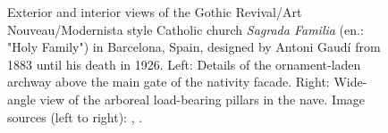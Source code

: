 \documentclass{article}
\begin{document}
\begin{figure}
    \centering
    \caption{Exterior and interior views of the Gothic Revival/Art Nouveau/Modernista style Catholic church \textit{Sagrada Familia} (en.: "Holy Family") in Barcelona, Spain, designed by Antoni Gaudí from 1883 until his death in 1926. Left: Details of the ornament-laden archway above the main gate of the nativity facade. Right: Wide-angle view of the arboreal load-bearing pillars in the nave. \newline Image sources (left to right): \cite{mortel_sagrada_2016}, \cite{wikimedia_commons_user_t_meltzer_sagrada_2014}.}
    \label{fig:sagrada}
\end{figure}
\end{document}

